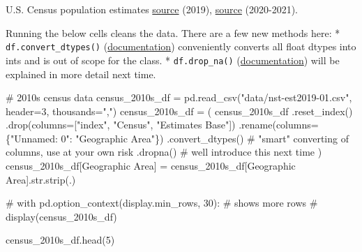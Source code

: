 \documentclass[
  letterpaper,
  DIV=11,
  numbers=noendperiod]{scrreprt}
\newenvironment{Shaded}{\begin{snugshade}}{\end{snugshade}}
\newcommand{\BuiltInTok}[1]{\textcolor[rgb]{0.00,0.23,0.31}{#1}}
\newcommand{\CommentTok}[1]{\textcolor[rgb]{0.37,0.37,0.37}{#1}}
\newcommand{\DecValTok}[1]{\textcolor[rgb]{0.68,0.00,0.00}{#1}}
\newcommand{\NormalTok}[1]{\textcolor[rgb]{0.00,0.23,0.31}{#1}}
\newcommand{\OperatorTok}[1]{\textcolor[rgb]{0.37,0.37,0.37}{#1}}
\newcommand{\StringTok}[1]{\textcolor[rgb]{0.13,0.47,0.30}{#1}}
\begin{document}
U.S. Census population estimates
\href{https://www.census.gov/data/tables/time-series/demo/popest/2010s-state-total.html}{source}
(2019),
\href{https://www.census.gov/data/tables/time-series/demo/popest/2020s-state-total.html}{source}
(2020-2021).

Running the below cells cleans the data. There are a few new methods
here: * \texttt{df.convert\_dtypes()}
(\href{https://pandas.pydata.org/docs/reference/api/pandas.DataFrame.convert_dtypes.html}{documentation})
conveniently converts all float dtypes into ints and is out of scope for
the class. * \texttt{df.drop\_na()}
(\href{https://pandas.pydata.org/docs/reference/api/pandas.DataFrame.dropna.html}{documentation})
will be explained in more detail next time.

\begin{Shaded}
\begin{Highlighting}[]
\CommentTok{\# 2010s census data}
\NormalTok{census\_2010s\_df }\OperatorTok{=}\NormalTok{ pd.read\_csv(}\StringTok{"data/nst{-}est2019{-}01.csv"}\NormalTok{, header}\OperatorTok{=}\DecValTok{3}\NormalTok{, thousands}\OperatorTok{=}\StringTok{","}\NormalTok{)}
\NormalTok{census\_2010s\_df }\OperatorTok{=}\NormalTok{ (}
\NormalTok{    census\_2010s\_df}
\NormalTok{    .reset\_index()}
\NormalTok{    .drop(columns}\OperatorTok{=}\NormalTok{[}\StringTok{"index"}\NormalTok{, }\StringTok{"Census"}\NormalTok{, }\StringTok{"Estimates Base"}\NormalTok{])}
\NormalTok{    .rename(columns}\OperatorTok{=}\NormalTok{\{}\StringTok{"Unnamed: 0"}\NormalTok{: }\StringTok{"Geographic Area"}\NormalTok{\})}
\NormalTok{    .convert\_dtypes()                 }\CommentTok{\# "smart" converting of columns, use at your own risk}
\NormalTok{    .dropna()                         }\CommentTok{\# we\textquotesingle{}ll introduce this next time}
\NormalTok{)}
\NormalTok{census\_2010s\_df[}\StringTok{\textquotesingle{}Geographic Area\textquotesingle{}}\NormalTok{] }\OperatorTok{=}\NormalTok{ census\_2010s\_df[}\StringTok{\textquotesingle{}Geographic Area\textquotesingle{}}\NormalTok{].}\BuiltInTok{str}\NormalTok{.strip(}\StringTok{\textquotesingle{}.\textquotesingle{}}\NormalTok{)}

\CommentTok{\# with pd.option\_context(\textquotesingle{}display.min\_rows\textquotesingle{}, 30): \# shows more rows}
\CommentTok{\#     display(census\_2010s\_df)}
    
\NormalTok{census\_2010s\_df.head(}\DecValTok{5}\NormalTok{)}
\end{Highlighting}
\end{Shaded}
\end{document}
